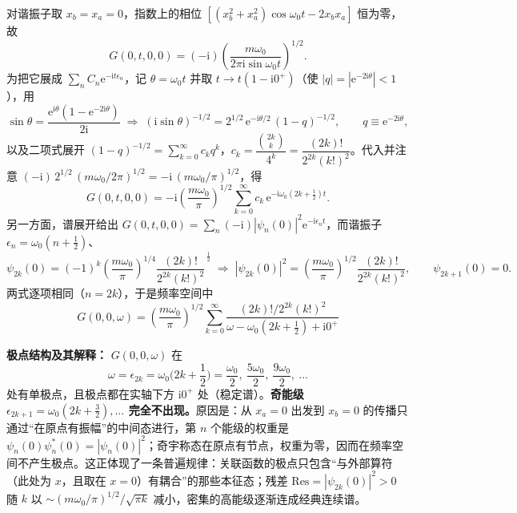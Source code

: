 对谐振子取 $x_b=x_a=0$，指数上的相位 $[(x_b^2+x_a^2)\cos\omega_0t-2x_bx_a]$ 恒为零，故
\begin{equation*}
G(0,t,0,0)=(-\mathrm{i})\left(\frac{m\omega_0}{2\pi\mathrm{i}\sin\omega_0 t}\right)^{1/2}.
\end{equation*}
为把它展成 $\sum_n C_n\mathrm{e}^{-\mathrm{i}t\epsilon_n}$，记 $\theta=\omega_0 t$ 并取 $t\to t(1-\mathrm{i}0^+)$（使 $|q|=|\mathrm{e}^{-2\mathrm{i}\theta}|<1$），用
\begin{equation*}
\sin\theta=\frac{\mathrm{e}^{\mathrm{i}\theta}(1-\mathrm{e}^{-2\mathrm{i}\theta})}{2\mathrm{i}}
\;\Rightarrow\;
(\mathrm{i}\sin\theta)^{-1/2}=2^{1/2}\,\mathrm{e}^{-\mathrm{i}\theta/2}\,(1-q)^{-1/2},\qquad q\equiv\mathrm{e}^{-2\mathrm{i}\theta},
\end{equation*}
以及二项式展开 $(1-q)^{-1/2}=\sum_{k=0}^{\infty}c_k q^k$，$c_k=\dfrac{\binom{2k}{k}}{4^k}=\dfrac{(2k)!}{2^{2k}(k!)^2}$。代入并注意 $(-\mathrm{i})\,2^{1/2}\,(m\omega_0/2\pi)^{1/2}=-\mathrm{i}\,(m\omega_0/\pi)^{1/2}$，得
\begin{equation*}
G(0,t,0,0)=-\mathrm{i}\left(\frac{m\omega_0}{\pi}\right)^{1/2}\sum_{k=0}^{\infty}c_k\,
\mathrm{e}^{-\mathrm{i}\omega_0(2k+\frac12)t}.
\end{equation*}
另一方面，谱展开给出 $G(0,t,0,0)=\sum_n(-\mathrm{i})|\psi_n(0)|^2\mathrm{e}^{-\mathrm{i}\epsilon_n t}$，而谐振子 $\epsilon_n=\omega_0(n+\frac12)$、
\begin{equation*}
\psi_{2k}(0)=(-1)^k\left(\frac{m\omega_0}{\pi}\right)^{1/4}\frac{(2k)!}{2^{2k}(k!)^2}^{\,\frac12}
\;\Rightarrow\;|\psi_{2k}(0)|^2=\left(\frac{m\omega_0}{\pi}\right)^{1/2}\frac{(2k)!}{2^{2k}(k!)^2},
\qquad \psi_{2k+1}(0)=0 .
\end{equation*}
两式逐项相同（$n=2k$），于是频率空间中
\begin{equation*}
\boxed{\;G(0,0,\omega)=\left(\frac{m\omega_0}{\pi}\right)^{1/2}
\sum_{k=0}^{\infty}\frac{(2k)!/2^{2k}(k!)^2}{\omega-\omega_0(2k+\frac12)+\mathrm{i}0^+}\;}
\end{equation*}

\textbf{极点结构及其解释：} $G(0,0,\omega)$ 在
\begin{equation*}
\omega=\epsilon_{2k}=\omega_0\Big(2k+\frac12\Big)=\frac{\omega_0}{2},\ \frac{5\omega_0}{2},\ \frac{9\omega_0}{2},\ \dots
\end{equation*}
处有单极点，且极点都在实轴下方 $\mathrm{i}0^+$ 处（稳定谱）。\textbf{奇能级 $\epsilon_{2k+1}=\omega_0(2k+\frac32),\dots$ 完全不出现。}原因是：从 $x_a=0$ 出发到 $x_b=0$ 的传播只通过“在原点有振幅”的中间态进行，第 $n$ 个能级的权重是 $\psi_n(0)\psi_n^*(0)=|\psi_n(0)|^2$；奇宇称态在原点有节点，权重为零，因而在频率空间不产生极点。这正体现了一条普遍规律：关联函数的极点只包含“与外部算符（此处为 $x$，且取在 $x=0$）有耦合”的那些本征态；残差 $\mathrm{Res}=|\psi_{2k}(0)|^2>0$ 随 $k$ 以 $\sim(m\omega_0/\pi)^{1/2}/\sqrt{\pi k}$ 减小，密集的高能级逐渐连成经典连续谱。

